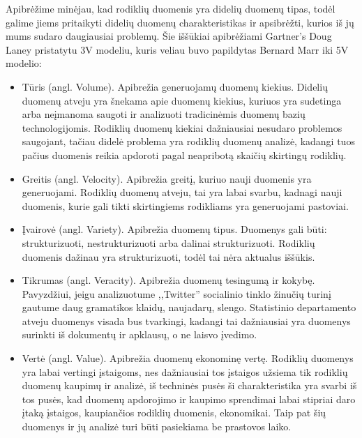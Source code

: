\documentclass{VUMIFPSkursinis}
\begin{document}
Apibrėžime minėjau, kad rodiklių duomenis yra didelių duomenų tipas, todėl galime jiems pritaikyti didelių duomenų charakteristikas ir apsibrėžti, kurios iš jų 
mums sudaro daugiausiai problemų. Šie iššūkiai apibrėžiami Gartner's Doug Laney pristatytu 3V modeliu\cite{laney20013d}, kuris veliau buvo papildytas Bernard Marr iki 5V modelio\cite{marr2014big}:
\begin{itemize}
    \item Tūris (angl. Volume). Apibrežia generuojamų duomenų kiekius. Didelių duomenų atveju yra šnekama apie duomenų kiekius, kuriuos yra sudetinga arba neįmanoma saugoti 
    ir analizuoti tradicinėmis duomenų bazių technologijomis. Rodiklių duomenų kiekiai dažniausiai nesudaro problemos saugojant, tačiau didelė problema yra rodiklių duomenų analizė, 
    kadangi tuos pačius duomenis reikia apdoroti pagal neapribotą skaičių skirtingų rodiklių.
    \item Greitis (angl. Velocity). Apibrežia greitį, kuriuo nauji duomenis yra generuojami. Rodiklių duomenų atveju, tai yra labai svarbu, kadnagi nauji duomenis, kurie gali 
    tikti skirtingiems rodikliams yra generuojami pastoviai.
    \item Įvairovė (angl. Variety). Apibrežia duomenų tipus. Duomenys gali būti: strukturizuoti, nestrukturizuoti arba dalinai strukturizuoti\cite{zikopoulos2011understanding}. 
    Rodiklių duomenis dažinau yra strukturizuoti, todėl tai nėra aktualus iššūkis.
    \item Tikrumas (angl. Veracity). Apibrežia duomenų tesingumą ir kokybę. Pavyzdžiui, jeigu analizuotume ,,Twitter'' socialinio tinklo žinučių turinį gautume daug gramatikos klaidų, naujadarų, slengo. 
    Statistinio departamento atveju duomenys visada bus tvarkingi, kadangi tai dažniausiai yra duomenys surinkti iš dokumentų ir apklausų, o ne laisvo įvedimo.
    \item Vertė (angl. Value). Apibrežia duomenų ekonominę vertę. Rodiklių duomenys yra labai vertingi įstaigoms, nes dažniausiai tos įstaigos užsiema tik rodiklių duomenų kaupimų ir analizė, iš techninės pusės
    ši charakteristika yra svarbi iš tos pusės, kad duomenų apdorojimo ir kaupimo sprendimai labai stipriai daro įtaką įstaigos, kaupiančios rodiklių duomenis, ekonomikai. Taip pat šių duomenys ir jų 
    analizė turi būti pasiekiama be prastovos laiko.
\end{itemize}
\end{document}
